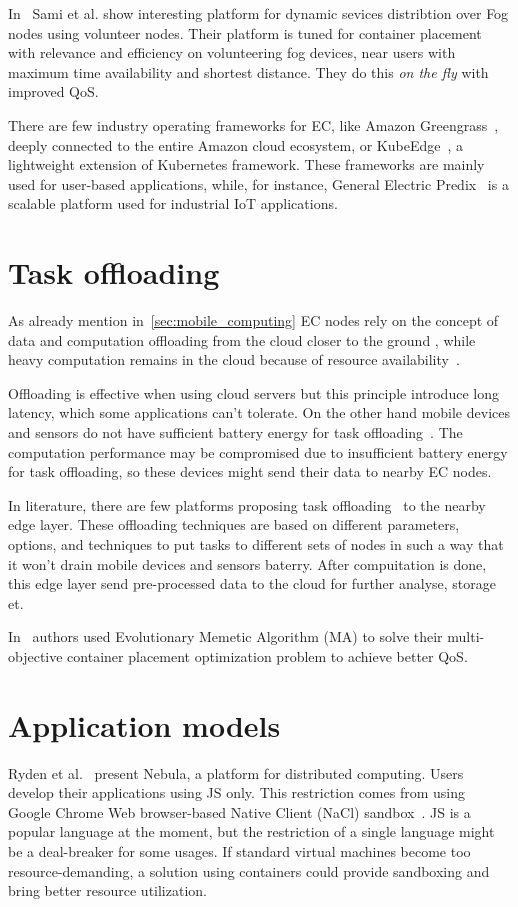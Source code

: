 In~\cite{SamiM20} Sami et al. show interesting platform for dynamic sevices distribtion over Fog nodes using volunteer nodes. Their platform is tuned for container placement with relevance and efficiency on volunteering fog devices, near users with maximum time availability and shortest distance. They do this \textit{on the fly}  with improved QoS.

There are few industry operating frameworks for EC, like Amazon Greengrass~\cite{kurniawan_2018}, deeply connected to the entire Amazon cloud ecosystem, or KubeEdge~\cite{KubeEdge}, a lightweight extension of Kubernetes framework. These frameworks are mainly used for user-based applications, while, for instance, General Electric Predix~\cite{GE_Predix} is a scalable platform used for industrial IoT applications.
%
%
\section{Task offloading}\label{sec:task_offloading}
%
As already mention in~\ref{sec:mobile_computing} EC nodes rely on the concept of data and computation offloading from the cloud closer to the ground \cite{KhuneP19}, while heavy computation remains in the cloud because of resource availability~\cite{NingLSY20}. 

Offloading is effective when using cloud servers but this principle introduce long latency, which some applications can't tolerate. On the other hand mobile devices and sensors do not have sufficient battery energy for task offloading~\cite{MaoZL16}. The computation performance may be compromised due to insufficient battery energy for task offloading, so these devices might send their data to nearby EC nodes.

In literature, there are few platforms proposing task offloading~\cite{ShiHPANZ14, KhuneP19, ChenHLLW15, LinLJL19, JiangCGZW19, MaoZL16} to the nearby edge layer. These offloading techniques are based on different parameters, options, and techniques to put tasks to different sets of nodes in such a way that it won't drain mobile devices and sensors baterry. After compuitation is done, this edge layer send pre-processed data to the cloud for further analyse, storage et.

In~\cite{SamiM20} authors used Evolutionary Memetic Algorithm (MA) to solve their multi-objective container placement optimization problem to achieve better QoS.
%
%
\section{Application models}\label{sec:applications}
%
Ryden et al.~\cite{RydenOCW14} present Nebula, a platform for distributed computing. Users develop their applications using JS only. This restriction comes from using Google Chrome Web browser-based Native Client (NaCl) sandbox~\cite{YeeSDCMOONF10}. JS is a popular language at the moment, but the restriction of a single language might be a deal-breaker for some usages. If standard virtual machines become too resource-demanding, a solution using containers could provide sandboxing and bring better resource utilization.

